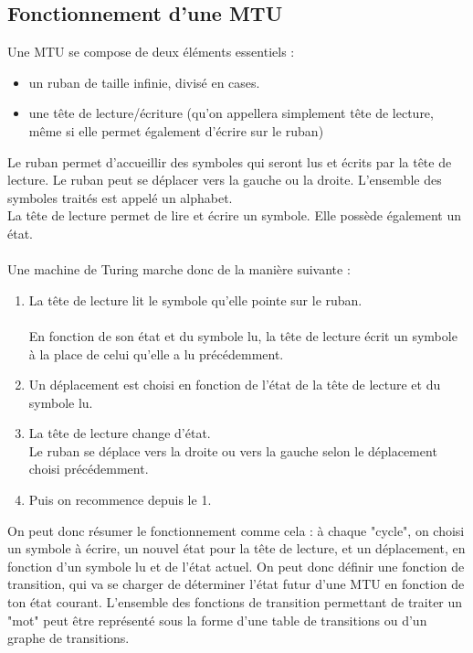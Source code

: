 \documentclass[12pt]{article}
\begin{document}
	\subsection{Fonctionnement d'une MTU}
	Une MTU se compose de deux éléments essentiels :
	\begin{itemize}[label=$-$]
				\item un ruban de taille infinie, divisé en cases.\\
		\item une tête de lecture/écriture (qu'on appellera simplement tête de lecture, même si elle permet également d'écrire sur le ruban)
	\end{itemize}
	Le ruban permet d'accueillir des symboles qui seront lus et écrits par la tête de lecture. Le ruban peut se déplacer vers la gauche ou la droite. L'ensemble des symboles traités est appelé un alphabet.\\
	La tête de lecture permet de lire et écrire un symbole. Elle possède également un état.\\
	\\
	Une machine de Turing marche donc de la manière suivante :\\
	\begin{enumerate}
		\item La tête de lecture lit le symbole qu'elle pointe sur le ruban.\\
		\\ En fonction de son état et du symbole lu, la tête de lecture écrit un symbole à la place de celui qu'elle a lu précédemment.\\
		\item Un déplacement est  choisi en fonction de l'état de la tête de lecture et du symbole lu.\\
		\item La tête de lecture change d'état.\\
		Le ruban se déplace vers la droite ou vers la gauche selon le déplacement choisi précédemment.\\
		\item Puis on recommence depuis le 1.
	\end{enumerate}
	 On peut donc résumer le fonctionnement comme cela : à chaque "cycle", on choisi un symbole à écrire, un nouvel état pour la tête de lecture, et un déplacement, en fonction d'un symbole lu et de l'état actuel. On peut donc définir une fonction de transition, qui va se charger de déterminer l'état futur d'une MTU en fonction de ton état courant. L'ensemble des fonctions de transition permettant de traiter un "mot" peut être représenté sous la forme d'une table de transitions ou d'un graphe de transitions.\\
\end{document}
